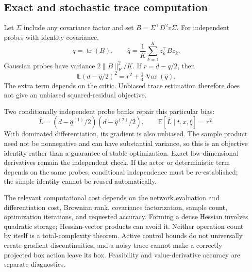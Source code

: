 \documentclass[ecta,draft]{econsocart}
\theoremstyle{definition}
\theoremstyle{remark}
\newcommand{\E}{\mathbb E}
\newcommand{\tr}{\operatorname{tr}}
\begin{document}



\subsection{Exact and stochastic trace computation}
Let $\Sigma$ include any covariance factor and set $B=\Sigma^\top D^2v\Sigma$. For independent probes with identity covariance,
\begin{equation}\label{eq:trace}
 q=\tr(B),\qquad \widehat q=\frac1K\sum_{k=1}^Kz_k^\top Bz_k.
\end{equation}
Gaussian probes have variance $2\|B\|_F^2/K$. If $r=d-q/2$, then
\begin{equation}\label{eq:tracebias}
 \E(d-\widehat q/2)^2=r^2+\tfrac14\operatorname{Var}(\widehat q).
\end{equation}
The extra term depends on the critic. Unbiased trace estimation therefore does not give an unbiased squared-residual objective.

Two conditionally independent probe banks repair this particular bias:
\begin{equation}\label{eq:crossprobe}
 \widehat L=(d-\widehat q^{(1)}/2)(d-\widehat q^{(2)}/2),
 \qquad\E[\widehat L\mid t,x,\xi]=r^2.
\end{equation}
With dominated differentiation, its gradient is also unbiased. The sample product need not be nonnegative and can have substantial variance, so this is an objective identity rather than a guarantee of stable optimization. Exact low-dimensional derivatives remain the independent check. If the actor or deterministic term depends on the same probes, conditional independence must be re-established; the simple identity cannot be reused automatically.

The relevant computational cost depends on the network evaluation and differentiation cost, Brownian rank, covariance factorization, sample count, optimization iterations, and requested accuracy. Forming a dense Hessian involves quadratic storage; Hessian-vector products can avoid it. Neither operation count by itself is a total-complexity theorem. Active control bounds do not universally create gradient discontinuities, and a noisy trace cannot make a correctly projected box action leave its box. Feasibility and value-derivative accuracy are separate diagnostics.


\end{document}
